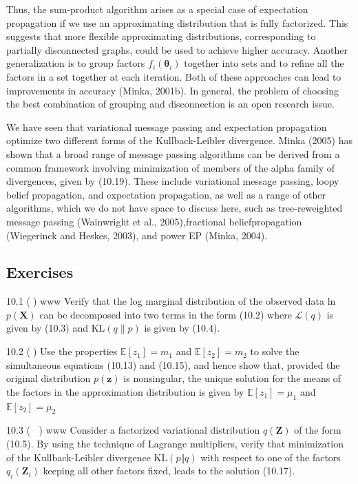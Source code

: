 \documentclass[
  10
]{article}
\begin{document}
Thus, the sum-product algorithm arises as a special case of expectation
propagation if we use an approximating distribution that is fully
factorized. This suggests that more flexible approximating
distributions, corresponding to partially disconnected graphs, could be
used to achieve higher accuracy. Another generalization is to group
factors \(f _ { i } ( \pmb \theta _ { i } )\) together into sets and to
refine all the factors in a set together at each iteration. Both of
these approaches can lead to improvements in accuracy (Minka, 2001b). In
general, the problem of choosing the best combination of grouping and
disconnection is an open research issue.

We have seen that variational message passing and expectation
propagation optimize two different forms of the Kullback-Leibler
divergence. Minka (2005) has shown that a broad range of message passing
algorithms can be derived from a common framework involving minimization
of members of the alpha family of divergences, given by (10.19). These
include variational message passing, loopy belief propagation, and
expectation propagation, as well as a range of other algorithms, which
we do not have space to discuss here, such as tree-reweighted message
passing (Wainwright et al., 2005),fractional beliefpropagation
(Wiegerinck and Heskes, 2003), and power EP (Minka, 2004).

\subsection{Exercises}\label{exercises-2}

10.1 () www Verify that the log marginal distribution of the observed
data ln \(p ( \mathbf { X } )\) can be decomposed into two terms in the
form (10.2) where \(\mathcal { L } ( q )\) is given by (10.3) and
\(\mathrm { K L } ( q \| p )\) is given by (10.4).

10.2 () Use the properties \(\mathbb { E } [ z _ { 1 } ] = m _ { 1 }\)
and \(\mathbb { E } [ z _ { 2 } ] = m _ { 2 }\) to solve the
simultaneous equations (10.13) and (10.15), and hence show that,
provided the original distribution \(p ( \mathbf { z } )\) is
nonsingular, the unique solution for the means of the factors in the
approximation distribution is given by
\(\mathbb { E } [ z _ { 1 } ] = \mu _ { 1 }\) and
\(\mathbb { E } [ z _ { 2 } ] = \mu _ { 2 }\)

10.3 ( ) www Consider a factorized variational distribution
\(q ( \mathbf { Z } )\) of the form (10.5). By using the technique of
Lagrange multipliers, verify that minimization of the Kullback-Leibler
divergence \(\mathrm { K L } ( p \Vert q )\) with respect to one of the
factors \(q _ { i } ( \mathbf { Z } _ { i } )\) keeping all other
factors fixed, leads to the solution (10.17).
\end{document}
